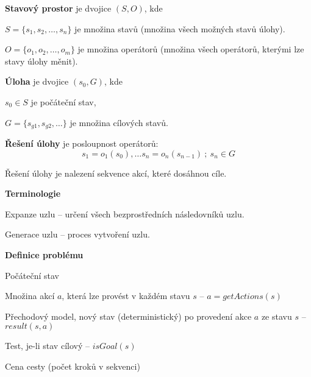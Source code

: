 \begin{compactitem}

    \item \textbf{Stavový prostor} je dvojice $(S, O)$, kde \begin{compactitem}
        \item $S = \{ s_1, s_2, \ldots, s_{n} \}$ je množina stavů (množina všech možných stavů úlohy).
        \item $O = \{ o_1, o_2, \ldots, o_{m} \}$ je množina operátorů (množina všech operátorů, kterými lze stavy úlohy měnit).
    \end{compactitem}

    \item \textbf{Úloha} je dvojice $(s_0, G)$, kde \begin{compactitem}
        \item $s_0 \in S$ je počáteční stav,
        \item $G = \{ s_{g1}, s_{g2}, \ldots \}$ je množina cílových stavů.
    \end{compactitem}

    \item \textbf{Řešení úlohy} je posloupnost operátorů:
    $$ s_1 = o_1(s_0), \ldots s_n = o_n(s_{n-1}) ~;~ s_n \in G $$
    \begin{compactitem}
        \item Řešení úlohy je nalezení sekvence akcí, které dosáhnou cíle.
    \end{compactitem}

    \item \textbf{Terminologie} \begin{compactitem}
        \item Expanze uzlu -- určení všech bezprostředních následovníků uzlu.
        \item Generace uzlu -- proces vytvoření uzlu.
    \end{compactitem}

    \item \textbf{Definice problému} \begin{compactenum}
        \item Počáteční stav
        \item Množina akcí $a$, která lze provést v každém stavu $s$ -- $a = getActions(s)$
        \item Přechodový model, nový stav (deterministický) po provedení akce $a$ ze stavu $s$ -- $result(s, a)$
        \item Test, je-li stav cílový -- $isGoal(s)$
        \item Cena cesty (počet kroků v sekvenci)
    \end{compactenum}


\end{compactitem}
